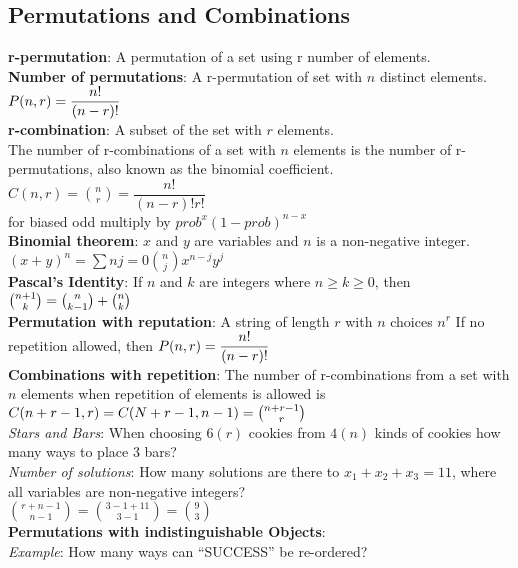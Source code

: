 \documentclass[letter]{article}
\begin{document}
\begin{multicols}{2}
  \subsection{Permutations and Combinations} 
  \textbf{r-permutation}: A permutation of a set using r number of
  elements. \\
  \textbf{Number of permutations}: A r-permutation of set with $n$ distinct
  elements.
  $\\P(n, r) = \dfrac{n!}{(n - r)!}$\\
  \textbf{r-combination}: A subset of the set with $r$ elements. \\
  The number of r-combinations of a set with $n$ elements is the number of
  r-permutations, also known as the binomial coefficient.\\
  $C(n, r) = \binom{n}{r} = \dfrac{n!}{(n - r)!r!}$\\
  for biased odd multiply by ${prob}^x{(1-prob)}^{n-x}$\\
  \textbf{Binomial theorem}: $x$ and $y$ are variables and $n$ is a
  non-negative integer. \\
  ${(x + y)}^{n} = \sum{n}{j = 0}\binom{n}{j}x^{n - j}y^{j}$\\
  \textbf{Pascal's Identity}: If $n$ and $k$ are integers where
  $n \geq k \geq 0$, then
  $\\\binom{n + 1}{k}=\binom{n}{k - 1}+\binom{n}{k}$\\
  \textbf{Permutation with reputation}: A string of length $r$ with $n$
  choices $n^r$ If no repetition allowed, then
  $\\P(n, r) = \dfrac{n!}{(n - r)!}$\\
  \textbf{Combinations with repetition}: The number of r-combinations from a
  set with $n$ elements when repetition of elements is allowed is
  $\\C(n + r - 1, r)=C(N + r - 1, n - 1) = \binom{n + r - 1}{r}$\\
  \textit{Stars and Bars}: When choosing $6(r)$ cookies from $4(n)$ kinds of
  cookies how many ways to place 3 bars? \\
  \textit{Number of solutions}: How many solutions are there to
  $x_1 + x_2 + x_3 = 11$, where all variables are non-negative integers? \\
  $\binom{r + n - 1}{n - 1} = \binom{3 - 1 + 11}{3 - 1} = \binom{9}{3}$\\
  \textbf{Permutations with indistinguishable Objects}: \\
  \textit{Example}: How many ways can ``SUCCESS'' be re-ordered? \\

\end{multicols}
\end{document}
